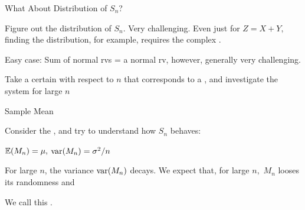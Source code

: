 \begin{frame}{What About Distribution of $S_n$?}
\plitemsep 0.1in
\bci
\item<2-> Figure out the distribution of $S_n$. Very challenging. Even just for $Z=X+Y,$ finding the distribution, for example, requires the complex .

\item<3-> Easy case: Sum of normal rvs = a normal rv, however, generally very challenging.

\item<4->  Take a certain  with respect to $n$ that corresponds to a , and investigate the system for large $n$


\eci

\end{frame}

\begin{frame}{Sample Mean}

\plitemsep 0.1in

\bci
\item<1-> Consider the , and try to understand how $S_n$ behaves:




\item<2-> $\mathbb{E}( M_n ) = \mu,$ $\text{var}( M_n ) = \sigma^2/n$

\item<3-> For large $n$, the variance $\text{var}( M_n )$ decays. We expect that, for large $n,$ $M_n$ looses its randomness and 

\item<4-> We call this .
\eci

\end{frame}


